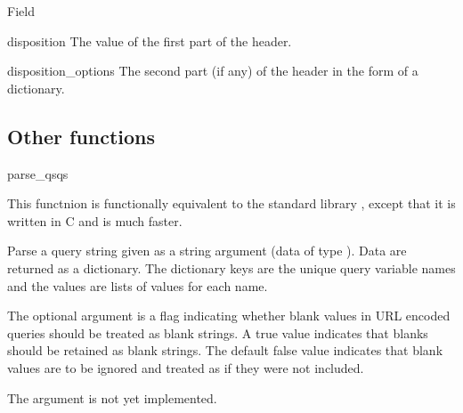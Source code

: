 \begin{classdesc}{Field}{}
\begin{memberdesc}{disposition}
The value of the first part of the  header.
\end{memberdesc}

\begin{memberdesc}{disposition_options}
The second part (if any) of the  header in
the form of a dictionary.
\end{memberdesc}

\begin{seealso}
\end{seealso}
\end{classdesc}

\subsection{Other functions\label{pyapi-util-funcs}}

\begin{funcdesc}{parse_qs}{qs}

This functnion is functionally equivalent to the standard library
 , except that it is written in C and is
much faster. 

Parse a query string given as a string argument (data of type
).  Data are
returned as a dictionary.  The dictionary keys are the unique query
variable names and the values are lists of values for each name.

The optional argument  is a flag indicating
whether blank values in URL encoded queries should be treated as blank
strings.  A true value indicates that blanks should be retained as
blank strings.  The default false value indicates that blank values
are to be ignored and treated as if they were not included.

 The  argument is not yet implemented.

\end{funcdesc}


